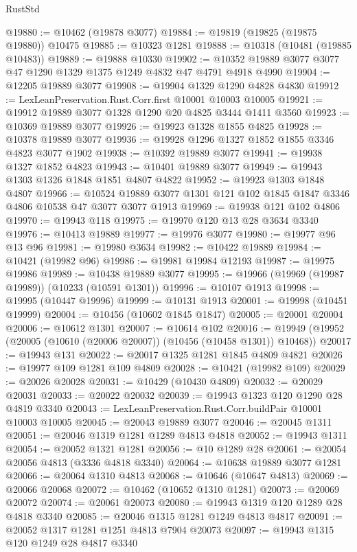 \begin{lexlean}{RustStd}
\begin{coremodule}
@19880 := @10462 (@19878 @3077)
@19884 := @19819 (@19825 (@19875 @19880)) @10475
@19885 := @10323 @1281
@19888 := @10318 (@10481 (@19885 @10483))
@19889 := @19888 @10330
@19902 := @10352 @19889 @3077 @3077 @47 @1290 @1329 @1375 @1249 @4832 @47 @4791 @4918 @4990
@19904 := @12205 @19889 @3077
@19908 := @19904 @1329 @1290 @4828 @4830
@19912 := LexLeanPreservation.Rust.Corr.first @10001 @10003 @10005
@19921 := @19912 @19889 @3077 @1328 @1290 @20 @4825 @3444 @1411 @3560
@19923 := @10369 @19889 @3077
@19926 := @19923 @1328 @1855 @4825
@19928 := @10378 @19889 @3077
@19936 := @19928 @1296 @1327 @1852 @1855 @3346 @4823 @3077 @1902
@19938 := @10392 @19889 @3077
@19941 := @19938 @1327 @1852 @4823
@19943 := @10401 @19889 @3077
@19949 := @19943 @1303 @1326 @1848 @1851 @4807 @4822
@19952 := @19923 @1303 @1848 @4807
@19966 := @10524 @19889 @3077 @1301 @121 @102 @1845 @1847 @3346 @4806 @10538 @47 @3077 @3077 @1913
@19969 := @19938 @121 @102 @4806
@19970 := @19943 @118
@19975 := @19970 @120 @13 @28 @3634 @3340
@19976 := @10413 @19889
@19977 := @19976 @3077
@19980 := @19977 @96 @13 @96
@19981 := @19980 @3634
@19982 := @10422 @19889
@19984 := @10421 (@19982 @96)
@19986 := @19981 @19984 @12193
@19987 := @19975 @19986
@19989 := @10438 @19889 @3077
@19995 := @19966 (@19969 (@19987 @19989)) (@10233 (@10591 @1301))
@19996 := @10107 @1913
@19998 := @19995 (@10447 @19996)
@19999 := @10131 @1913
@20001 := @19998 (@10451 @19999)
@20004 := @10456 (@10602 @1845 @1847)
@20005 := @20001 @20004
@20006 := @10612 @1301
@20007 := @10614 @102
@20016 := @19949 (@19952 (@20005 (@10610 (@20006 @20007)) (@10456 (@10458 @1301)) @10468))
@20017 := @19943 @131
@20022 := @20017 @1325 @1281 @1845 @4809 @4821
@20026 := @19977 @109 @1281 @109 @4809
@20028 := @10421 (@19982 @109)
@20029 := @20026 @20028
@20031 := @10429 (@10430 @4809)
@20032 := @20029 @20031
@20033 := @20022 @20032
@20039 := @19943 @1323 @120 @1290 @28 @4819 @3340
@20043 := LexLeanPreservation.Rust.Corr.buildPair @10001 @10003 @10005
@20045 := @20043 @19889 @3077
@20046 := @20045 @1311
@20051 := @20046 @1319 @1281 @1289 @4813 @4818
@20052 := @19943 @1311
@20054 := @20052 @1321 @1281
@20056 := @10 @1289 @28
@20061 := @20054 @20056 @4813 (@3336 @4818 @3340)
@20064 := @10638 @19889 @3077 @1281
@20066 := @20064 @1310 @4813
@20068 := @10646 (@10647 @4813)
@20069 := @20066 @20068
@20072 := @10462 (@10652 @1310 @1281)
@20073 := @20069 @20072
@20074 := @20061 @20073
@20080 := @19943 @1319 @120 @1289 @28 @4818 @3340
@20085 := @20046 @1315 @1281 @1249 @4813 @4817
@20091 := @20052 @1317 @1281 @1251 @4813 @7904 @20073
@20097 := @19943 @1315 @120 @1249 @28 @4817 @3340

\end{coremodule}
\end{lexlean}
